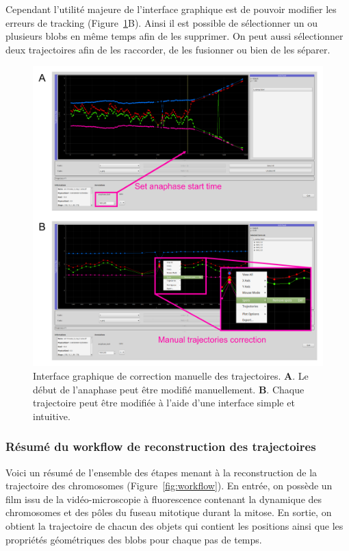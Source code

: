 \documentclass[12pt,a4paper,twoside,openright]{book}
\begin{document}
Cependant l'utilité majeure de l'interface graphique est de pouvoir
modifier les erreurs de tracking (Figure~\ref{fig:gui}B). Ainsi il est
possible de sélectionner un ou plusieurs blobs en même temps afin de les
supprimer. On peut aussi sélectionner deux trajectoires afin de les
raccorder, de les fusionner ou bien de les séparer.

\begin{figure}[htbp]
\centering
\includegraphics{figures/results/imaging/gui.png}
\caption[Interface graphique de correction manuelle des trajectoires]{\label{fig:gui}Interface
graphique de correction manuelle des trajectoires. \textbf{A}. Le début
de l'anaphase peut être modifié manuellement. \textbf{B}. Chaque
trajectoire peut être modifiée à l'aide d'une interface simple et
intuitive.}
\end{figure}

\subsubsection{Résumé du workflow de reconstruction des
trajectoires}\label{ruxe9sumuxe9-du-workflow-de-reconstruction-des-trajectoires}

Voici un résumé de l'ensemble des étapes menant à la reconstruction de
la trajectoire des chromosomes (Figure~\ref{fig:workflow}). En entrée,
on possède un film issu de la vidéo-microscopie à fluorescence contenant
la dynamique des chromosomes et des pôles du fuseau mitotique durant la
mitose. En sortie, on obtient la trajectoire de chacun des objets qui
contient les positions ainsi que les propriétés géométriques des blobs
pour chaque pas de temps.
\end{document}
